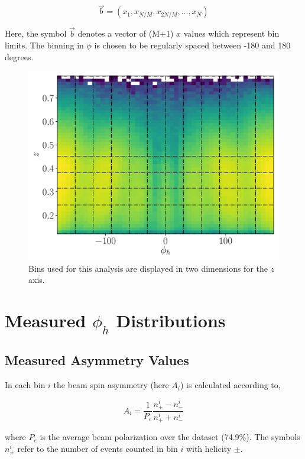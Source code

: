 \begin{equation}
  \vec{b} = (x_1, x_{N/M}, x_{2N/M}, ..., x_N)
\end{equation}

Here, the symbol $\vec{b}$ denotes a vector of (M+1) $x$ values which represent bin limits.  The binning in $\phi$ is chosen to be regularly spaced between -180 and 180 degrees.    

\begin{figure}
	\centering
	\label{fig:binning-z-phi}
	\includegraphics[width = 12cm]{image/plots/kaon-bsa/binning_z_phi.pdf}
	\caption{Bins used for this analysis are displayed in two dimensions for the $z$ axis.}
\end{figure}

\section{Measured $\phi_h$ Distributions}
\subsection*{Measured Asymmetry Values}
In each bin $i$ the beam spin asymmetry (here $A_i$) is calculated according to, 

\begin{equation}
  A_i = \frac{1}{P_e} \frac{n_+^i - n_-^i}{n_+^i + n_-^i}
\end{equation}

where $P_e$ is the average beam polarization over the dataset (74.9\%).  The symbols $n_{\pm}^{i}$ refer to the number of events counted in bin $i$ with helicity $\pm$.  

